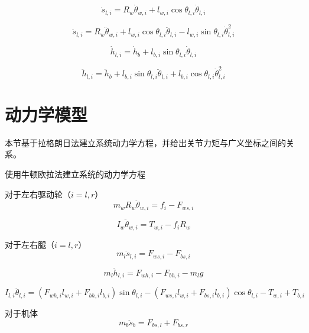 \documentclass[
  oneside,
  degree=bachelor,
  fullwidthstop=false,
  fontset=fandol,
  times=false,
  minted=true,
  biblatex=true,
]{tongjithesis}
\begin{document}
\begin{equation}
\dot{s}_{l,i} = R_w\dot{\theta}_{w,i} + l_{w,i}\cos\theta_{l,i}\dot{\theta}_{l,i} 
\end{equation}

\begin{equation}
\ddot{s}_{l,i} = R_w\ddot{\theta}_{w,i} + l_{w,i}\cos\theta_{l,i}\ddot{\theta}_{l,i} - l_{w,i}\sin\theta_{l,i}\dot{\theta}_{l,i}^2 
\end{equation}

\begin{equation}
\dot{h}_{l,i} = \dot{h}_b + l_{b,i}\sin\theta_{l,i}\dot{\theta}_{l,i} 
\end{equation}

\begin{equation}
\ddot{h}_{l,i} = \ddot{h}_b + l_{b,i}\sin\theta_{l,i}\ddot{\theta}_{l,i} + l_{b,i}\cos\theta_{l,i}\dot{\theta}_{l,i}^2 
\end{equation}

\section{动力学模型}

本节基于拉格朗日法建立系统动力学方程，并给出关节力矩与广义坐标之间的关系。

使用牛顿欧拉法建立系统的动力学方程

对于左右驱动轮（$i = l, r$）
\begin{equation}
m_w R_w \ddot{\theta}_{w,i} = f_i - F_{ws,i} 
\end{equation}

\begin{equation}
I_w \ddot{\theta}_{w,i} = T_{w,i} - f_i R_w
\end{equation}

对于左右腿（$i = l, r$）
\begin{equation}
m_l \ddot{s}_{l,i} = F_{ws,i} - F_{bs,i} 
\end{equation}

\begin{equation}
m_l \ddot{h}_{l,i} = F_{wh,i} - F_{bh,i} - m_l g 
\end{equation}

\begin{equation}
I_{l,i} \ddot{\theta}_{l,i} = (F_{wh,i} l_{w,i} + F_{bh,i} l_{b,i}) \sin\theta_{l,i} - (F_{ws,i} l_{w,i} + F_{bs,i} l_{b,i}) \cos\theta_{l,i} - T_{w,i} + T_{b,i} 
\end{equation}

对于机体
\begin{equation}
m_b \ddot{s}_b = F_{bs,l} + F_{bs,r} 
\end{equation}
\end{document}
